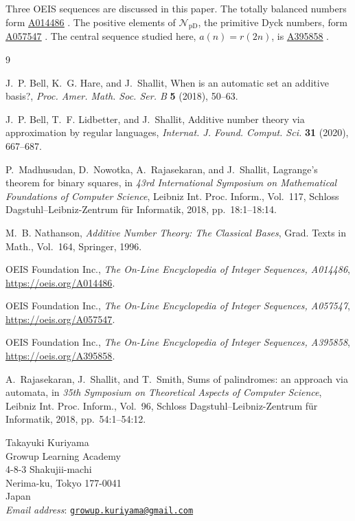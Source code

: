 \documentclass[12pt]{article}
\theoremstyle{plain}
\newcommand{\NpD}{\mathcal{N}_{\mathrm{pD}}}
\newcommand{\seqnum}[1]{\href{https://oeis.org/#1}{\rm \underline{#1}}}
\begin{document}
Three OEIS sequences are discussed in this paper.  The totally balanced
numbers form \seqnum{A014486} \cite{OEIS-A014486}.  The positive
elements of $\NpD$, the primitive Dyck numbers, form \seqnum{A057547}
\cite{OEIS-A057547}.  The central sequence studied here,
$a(n)=r(2n)$, is \seqnum{A395858} \cite{OEIS-A395858}.

\begin{thebibliography}{9}

J.~P. Bell, K.~G. Hare, and J.~Shallit,
When is an automatic set an additive basis?,
\emph{Proc. Amer. Math. Soc. Ser. B} \textbf{5} (2018), 50--63.

J.~P. Bell, T.~F. Lidbetter, and J.~Shallit,
Additive number theory via approximation by regular languages,
\emph{Internat. J. Found. Comput. Sci.} \textbf{31} (2020), 667--687.

P.~Madhusudan, D.~Nowotka, A.~Rajasekaran, and J.~Shallit,
Lagrange's theorem for binary squares,
in \emph{43rd International Symposium on Mathematical Foundations of
Computer Science}, Leibniz Int. Proc. Inform., Vol.~117, Schloss
Dagstuhl--Leibniz-Zentrum f{\"u}r Informatik, 2018, pp.~18:1--18:14.

M.~B. Nathanson,
\emph{Additive Number Theory: The Classical Bases},
Grad. Texts in Math., Vol.~164, Springer, 1996.

OEIS Foundation Inc.,
\emph{The On-Line Encyclopedia of Integer Sequences, A014486},
\url{https://oeis.org/A014486}.

OEIS Foundation Inc.,
\emph{The On-Line Encyclopedia of Integer Sequences, A057547},
\url{https://oeis.org/A057547}.

OEIS Foundation Inc.,
\emph{The On-Line Encyclopedia of Integer Sequences, A395858},
\url{https://oeis.org/A395858}.

A.~Rajasekaran, J.~Shallit, and T.~Smith,
Sums of palindromes: an approach via automata,
in \emph{35th Symposium on Theoretical Aspects of Computer Science},
Leibniz Int. Proc. Inform., Vol.~96, Schloss Dagstuhl--Leibniz-Zentrum
f{\"u}r Informatik, 2018, pp.~54:1--54:12.

\end{thebibliography}


\begin{flushleft}
Takayuki Kuriyama\\
Growup Learning Academy\\
4-8-3 Shakujii-machi\\
Nerima-ku, Tokyo 177-0041\\
Japan\\
\textit{Email address}: \href{mailto:growup.kuriyama@gmail.com}
{\texttt{growup.kuriyama@gmail.com}}
\end{flushleft}
\end{document}
